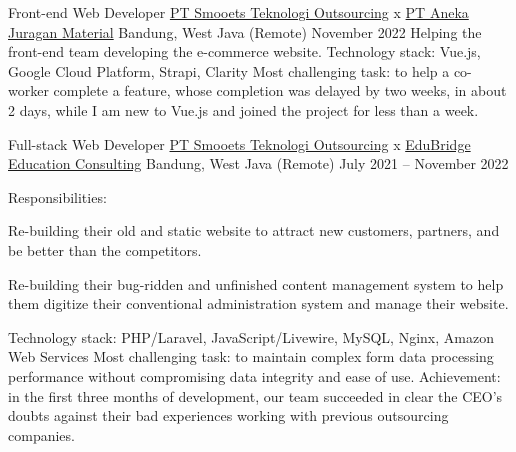 


\begin{cventries}


\cventry
{Front-end Web Developer} %
{\href{https://www.smooets.com/}{PT Smooets Teknologi Outsourcing} x \href{https://juraganmaterial.id/}{PT Aneka Juragan Material}} %
{Bandung, West Java (Remote)} %
{November 2022} %
{ %
Helping the front-end team developing the e-commerce website.
\linebreak
Technology stack: Vue.js, Google Cloud Platform, Strapi, Clarity
\linebreak
Most challenging task: to help a co-worker complete a feature, whose completion was delayed by two weeks, in about 2 days, while I am new to Vue.js and joined the project for less than a week.
}

\cventry
{Full-stack Web Developer} %
{\href{https://www.smooets.com/}{PT Smooets Teknologi Outsourcing} x \href{https://www.edubridge.co.id/}{EduBridge Education Consulting}} %
{Bandung, West Java (Remote)} %
{July 2021 -- November 2022} %
{ %
Responsibilities:
\vspace{5mm}
\begin{cvitems}
\item {Re-building their old and static website to attract new customers, partners, and be better than the competitors.}
\item {Re-building their bug-ridden and unfinished content management system to help them digitize their conventional administration system and manage their website.}
\end{cvitems}
\vspace{4mm}
Technology stack: PHP/Laravel, JavaScript/Livewire, MySQL, Nginx, Amazon Web Services
\linebreak
Most challenging task: to maintain complex form data processing performance without compromising data integrity and ease of use.
\linebreak
Achievement: in the first three months of development, our team succeeded in clear the CEO's doubts against their bad experiences working with previous outsourcing companies.
}


\end{cventries}
